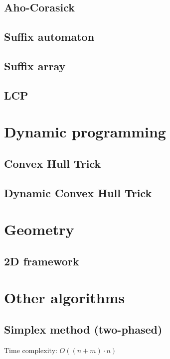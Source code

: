 \documentclass[12pt]{article}
\begin{document}
\subsection{Aho-Corasick}

\subsection{Suffix automaton}

\subsection{Suffix array}
\subsection{LCP}

\section{Dynamic programming}
\subsection{Convex Hull Trick}

\subsection{Dynamic Convex Hull Trick}


\section{Geometry}
\subsection{2D framework}


\section{Other algorithms}
\subsection{Simplex method (two-phased)}
Time complexity: $O((n + m) \cdot n)$

\end{document}
